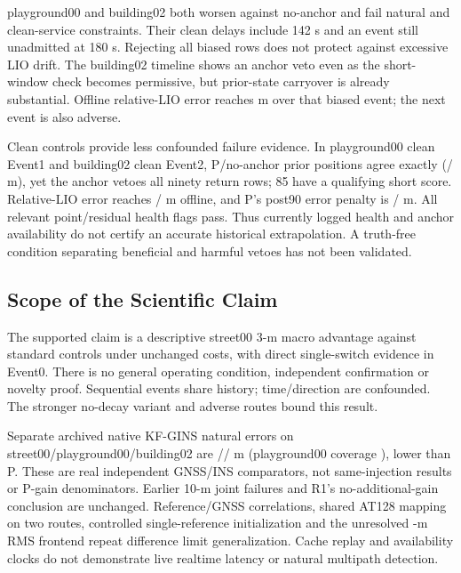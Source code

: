 \documentclass[conference]{IEEEtran}
\begin{document}
playground00 and building02 both worsen against no-anchor and fail natural and clean-service constraints. Their clean delays include 142 s and an event still unadmitted at 180 s. Rejecting all biased rows does not protect against excessive LIO drift. The building02 timeline shows an anchor veto even as the short-window check becomes permissive, but prior-state carryover is already substantial. Offline relative-LIO error reaches  m over that biased event; the next event is also adverse.

Clean controls provide less confounded failure evidence. In playground00 clean Event1 and building02 clean Event2, P/no-anchor prior positions agree exactly (/ m), yet the anchor vetoes all ninety return rows; 85 have a qualifying short score. Relative-LIO error reaches / m offline, and P's post90 error penalty is / m. All relevant point/residual health flags pass. Thus currently logged health and anchor availability do not certify an accurate historical extrapolation. A truth-free condition separating beneficial and harmful vetoes has not been validated.


\subsection{Scope of the Scientific Claim}
The supported claim is a descriptive street00 3-m macro advantage against standard controls under unchanged costs, with direct single-switch evidence in Event0. There is no general operating condition, independent confirmation or novelty proof. Sequential events share history; time/direction are confounded. The stronger no-decay variant and adverse routes bound this result.

Separate archived native KF-GINS natural errors on street00/playground00/building02 are // m (playground00 coverage ), lower than P. These are real independent GNSS/INS comparators, not same-injection results or P-gain denominators. Earlier 10-m joint failures and R1's no-additional-gain conclusion are unchanged. Reference/GNSS correlations, shared AT128 mapping on two routes, controlled single-reference initialization and the unresolved -m RMS frontend repeat difference limit generalization. Cache replay and availability clocks do not demonstrate live realtime latency or natural multipath detection.
\end{document}
